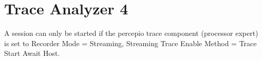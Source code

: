 %
%
%
%
\section{Trace Analyzer 4}
A session can only be started if the percepio trace component (processor expert) is set to Recorder Mode = Streaming, Streaming Trace Enable Method = Trace Start Await Host.